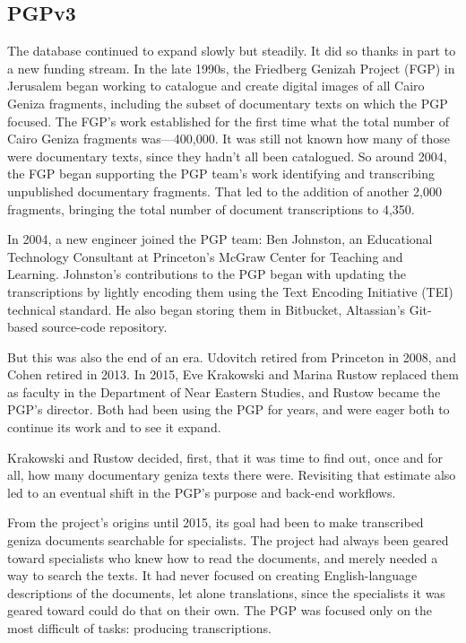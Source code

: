 \documentclass{article}
\begin{document}
\subsection{PGPv3}

The database continued to expand slowly but steadily. It did so thanks in part to a new funding stream. In the late 1990s, the Friedberg Genizah Project (FGP) in Jerusalem began working to catalogue and create digital images of all Cairo Geniza fragments, including the subset of documentary texts on which the PGP focused. The FGP’s work established for the first time what the total number of Cairo Geniza fragments was—400,000. It was still not known how many of those were documentary texts, since they hadn’t all been catalogued. So around 2004, the FGP began supporting the PGP team’s work identifying and transcribing unpublished documentary fragments. That led to the addition of another 2,000 fragments, bringing the total number of document transcriptions to 4,350.

In 2004, a new engineer joined the PGP team: Ben Johnston, an Educational Technology Consultant at Princeton’s McGraw Center for Teaching and Learning. Johnston’s contributions to the PGP began with updating the transcriptions by lightly encoding them using the Text Encoding Initiative (TEI) technical standard. He also began storing them in Bitbucket, Altassian’s Git-based source-code repository. 

But this was also the end of an era. Udovitch retired from Princeton in 2008, and Cohen retired in 2013. In 2015, Eve Krakowski and Marina Rustow replaced them as faculty in the Department of Near Eastern Studies, and Rustow became the PGP’s director. Both had been using the PGP for years, and were eager both to continue its work and to see it expand. 

Krakowski and Rustow decided, first, that it was time to find out, once and for all, how many documentary geniza texts there were. Revisiting that estimate also led to an eventual shift in the PGP’s purpose and back-end workflows. 

From the project’s origins until 2015, its goal had been to make transcribed geniza documents searchable for specialists. The project had always been geared toward specialists who knew how to read the documents, and merely needed a way to search the texts. It had never focused on creating English-language descriptions of the documents, let alone translations, since the specialists it was geared toward could do that on their own. The PGP was focused only on the most difficult of tasks: producing transcriptions. 
\end{document}
